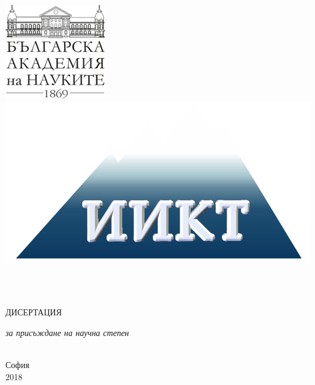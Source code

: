 \documentclass[12pt,bulgarian,singlespacing,headsepline,oneside,openany]{IICTBASDoctoralThesis}
\author{\href{http://www.linkedin.com/in/todor-balabanov-2805393}{д-р инж. Тодор Димитров \textsc{Балабанов}}}
\begin{document}
\frontmatter

\pagestyle{plain}


\begin{titlepage}
\begin{center}

\vspace*{.01\textheight}

{\scshape \LARGE 
\includegraphics[width=0.08\linewidth]{logo-bas-bg}
\univname \\[0.5cm] 
\includegraphics[width=0.1\linewidth]{logo-iict-bg}
\facname \\[0.5cm] 
\deptname \par}

\vspace{1.5cm}
 
\aname

\vspace{1.5cm}

\HRule \\[0.4cm]

{\large \bfseries \ttitle \par}\vspace{0.4cm}

\HRule \\[1.5cm]

\textsc{\Large ДИСЕРТАЦИЯ}\\[0.5cm] 
 
\vfill

\large \textit{за присъждане на научна степен\\ \degreename}\\[1.3cm]

\subjectname \vspace{1.5cm}
 
\vfill
 
{\large София \\ 2018}
 
\vfill
\end{center}
\end{titlepage}
\end{document}
